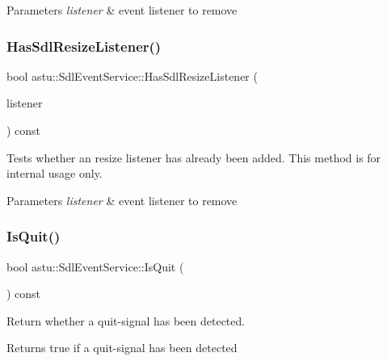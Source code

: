 \begin{DoxyParams}{Parameters}
{\em listener} & event listener to remove \\
\hline
\end{DoxyParams}
\mbox{\label{classastu_1_1SdlEventService_a0358addd25338f055f38912df3211ffa}} 
\subsubsection{\texorpdfstring{Has\+Sdl\+Resize\+Listener()}{HasSdlResizeListener()}}
{\footnotesize\ttfamily bool astu\+::\+Sdl\+Event\+Service\+::\+Has\+Sdl\+Resize\+Listener (\begin{DoxyParamCaption}\item[{\hyperlink{classastu_1_1ISdlResizeListener}{I\+Sdl\+Resize\+Listener} \&}]{listener }\end{DoxyParamCaption}) const}

Tests whether an resize listener has already been added. This method is for internal usage only.


\begin{DoxyParams}{Parameters}
{\em listener} & event listener to remove \\
\hline
\end{DoxyParams}
\mbox{\label{classastu_1_1SdlEventService_ac7b0eaae46bff34cc0d305a3dc3cea68}} 
\subsubsection{\texorpdfstring{Is\+Quit()}{IsQuit()}}
{\footnotesize\ttfamily bool astu\+::\+Sdl\+Event\+Service\+::\+Is\+Quit (\begin{DoxyParamCaption}{ }\end{DoxyParamCaption}) const}

Return whether a quit-\/signal has been detected.

\begin{DoxyReturn}{Returns}
{\ttfamily true} if a quit-\/signal has been detected 
\end{DoxyReturn}
\mbox{\label{classastu_1_1SdlEventService_a0163bd191605b5068d93cd6c8f26da0c}} 
